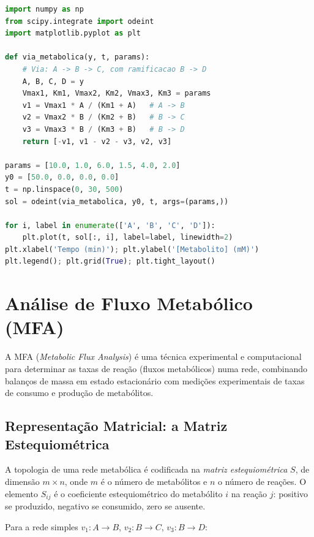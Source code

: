 \begin{lstlisting}[language=Python, caption=Via metabolica com cinetica Michaelis-Menten]
import numpy as np
from scipy.integrate import odeint
import matplotlib.pyplot as plt

def via_metabolica(y, t, params):
    # Via: A -> B -> C, com ramificacao B -> D
    A, B, C, D = y
    Vmax1, Km1, Vmax2, Km2, Vmax3, Km3 = params
    v1 = Vmax1 * A / (Km1 + A)   # A -> B
    v2 = Vmax2 * B / (Km2 + B)   # B -> C
    v3 = Vmax3 * B / (Km3 + B)   # B -> D
    return [-v1, v1 - v2 - v3, v2, v3]

params = [10.0, 1.0, 6.0, 1.5, 4.0, 2.0]
y0 = [50.0, 0.0, 0.0, 0.0]
t = np.linspace(0, 30, 500)
sol = odeint(via_metabolica, y0, t, args=(params,))

for i, label in enumerate(['A', 'B', 'C', 'D']):
    plt.plot(t, sol[:, i], label=label, linewidth=2)
plt.xlabel('Tempo (min)'); plt.ylabel('[Metabolito] (mM)')
plt.legend(); plt.grid(True); plt.tight_layout()
\end{lstlisting}


\section{Análise de Fluxo Metabólico (MFA)}

\begin{definicaoenv}
A MFA (\textit{Metabolic Flux Analysis}) é uma técnica experimental e computacional para
determinar as taxas de reação (fluxos metabólicos) numa rede, combinando balanços de massa
em estado estacionário com medições experimentais de taxas de consumo e produção de
metabólitos.
\end{definicaoenv}

\subsection{Representação Matricial: a Matriz Estequiométrica}

A topologia de uma rede metabólica é codificada na \emph{matriz estequiométrica} $S$,
de dimensão $m \times n$, onde $m$ é o número de metabólitos e $n$ o número de reações.
O elemento $S_{ij}$ é o coeficiente estequiométrico do metabólito $i$ na reação $j$:
positivo se produzido, negativo se consumido, zero se ausente.

Para a rede simples $v_1: A \to B$, $v_2: B \to C$, $v_3: B \to D$:

